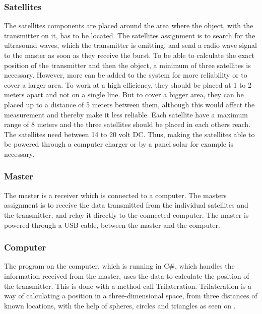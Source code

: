 \subsubsection{Satellites}
The satellites components are placed around the area where the object, with the transmitter on it, has to be located. The satellites assignment is to search for the ultrasound waves, which the transmitter is emitting, and send a radio wave signal to the master as soon as they receive the burst.
To be able to calculate the exact position of the transmitter and then the object, a minimum of three satellites is necessary. However, more can be added to the system for more reliability or to cover a larger area. To work at a high efficiency, they should be placed at 1 to 2 meters apart and not on a single line. But to cover a bigger area, they can be placed up to a distance of 5 meters between them, although this would affect the measurement and thereby make it less reliable. Each satellite have a maximum range of 8 meters and the three satellites should be placed in each others reach. The satellites need between 14 to 20 volt DC. Thus, making the satellites able to be powered through a computer charger or by a panel solar for example is necessary.

\subsubsection{Master}
The master is a receiver which is connected to a computer. The masters assignment is to receive the data transmitted from the individual satellites and the transmitter, and relay it directly to the connected computer. The master is powered through a USB cable, between the master and the computer.\\

\subsubsection{Computer}
The program on the computer, which is running in C\#, which handles the information received from the master, uses the data to calculate the position of the transmitter. This is done with a method call Trilateration. Trilateration is a way of calculating a position in a three-dimensional space, from three distances of known locations, with the help of spheres, circles and triangles as seen on .

